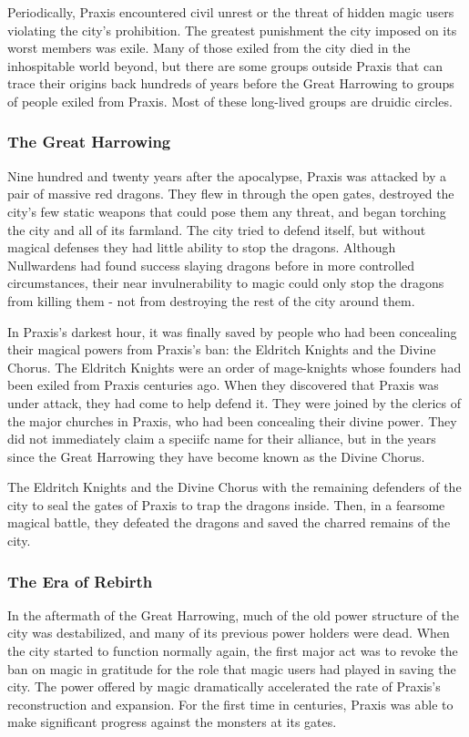             Periodically, Praxis encountered civil unrest or the threat of hidden magic users violating the city's prohibition.
            The greatest punishment the city imposed on its worst members was exile.
            Many of those exiled from the city died in the inhospitable world beyond, but there are some groups outside Praxis that can trace their origins back hundreds of years before the Great Harrowing to groups of people exiled from Praxis.
            Most of these long-lived groups are druidic circles.

        \subsubsection{The Great Harrowing}
            Nine hundred and twenty years after the apocalypse, Praxis was attacked by a pair of massive red dragons.
            They flew in through the open gates, destroyed the city's few static weapons that could pose them any threat, and began torching the city and all of its farmland.
            The city tried to defend itself, but without magical defenses they had little ability to stop the dragons.
            Although Nullwardens had found success slaying dragons before in more controlled circumstances, their near invulnerability to magic could only stop the dragons from killing them - not from destroying the rest of the city around them.

            In Praxis's darkest hour, it was finally saved by people who had been concealing their magical powers from Praxis's ban: the Eldritch Knights and the Divine Chorus.
            The Eldritch Knights were an order of mage-knights whose founders had been exiled from Praxis centuries ago.
            When they discovered that Praxis was under attack, they had come to help defend it.
            They were joined by the clerics of the major churches in Praxis, who had been concealing their divine power.
            They did not immediately claim a speciifc name for their alliance, but in the years since the Great Harrowing they have become known as the Divine Chorus.

            The Eldritch Knights and the Divine Chorus with the remaining defenders of the city to seal the gates of Praxis to trap the dragons inside.
            Then, in a fearsome magical battle, they defeated the dragons and saved the charred remains of the city.

        \subsubsection{The Era of Rebirth}
            In the aftermath of the Great Harrowing, much of the old power structure of the city was destabilized, and many of its previous power holders were dead.
            When the city started to function normally again, the first major act was to revoke the ban on magic in gratitude for the role that magic users had played in saving the city.
            The power offered by magic dramatically accelerated the rate of Praxis's reconstruction and expansion.
            For the first time in centuries, Praxis was able to make significant progress against the monsters at its gates.

